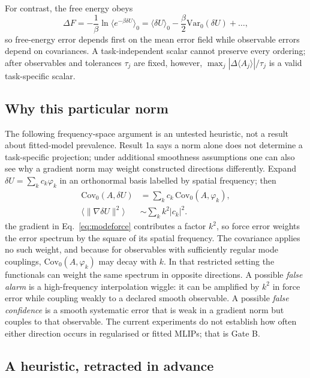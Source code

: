\documentclass[aip,jcp,reprint,amsmath,amssymb,floatfix]{revtex4-2}
\newcommand{\dU}{\ensuremath{\delta U}}
\newcommand{\avg}[1]{\ensuremath{\langle #1 \rangle}}
\newcommand{\avgz}[1]{\ensuremath{\langle #1 \rangle_{0}}}
\newcommand{\Cov}{\ensuremath{\mathrm{Cov}}}
\newcommand{\Var}{\ensuremath{\mathrm{Var}}}
\begin{document}
For contrast, the free energy obeys\cite{Zwanzig1954}
\begin{equation}
\Delta F = -\frac{1}{\beta}\ln\avgz{e^{-\beta\dU}}
= \avgz{\dU} - \frac{\beta}{2}\Var_0(\dU) + \dots,
\end{equation}
so free-energy error depends first on the mean error field while observable
errors depend on covariances. A task-independent scalar cannot preserve every
ordering; after observables and tolerances $\tau_j$ are fixed, however,
$\max_j|\Delta\avg{A_j}|/\tau_j$ is a valid task-specific scalar.

\subsection{Why this particular norm}
\label{sec:frequency}

The following frequency-space argument is an untested heuristic, not a result
about fitted-model prevalence. Result 1a says a norm alone does not determine a
task-specific projection; under additional smoothness assumptions one can also
see why a gradient norm may weight constructed directions differently.
Expand $\dU = \sum_k c_k \varphi_k$ in an orthonormal basis labelled by
spatial frequency; then
\begin{align}
\Cov_0(A,\dU) &= \sum_k c_k \,\Cov_0(A, \varphi_k), \label{eq:modecov}\\
\big\langle\|\nabla\dU\|^2\big\rangle &\sim \sum_k k^2 |c_k|^2. \label{eq:modeforce}
\end{align}
the gradient in Eq.~\eqref{eq:modeforce} contributes a factor $k^2$, so force
error weights the error spectrum by the square of its spatial frequency. The
covariance applies no such weight, and because
for observables with sufficiently regular mode couplings, $\Cov_0(A,
\varphi_k)$ may decay with $k$. In that restricted setting the functionals can
weight the same spectrum in opposite directions. A possible \emph{false alarm}
is a high-frequency interpolation wiggle: it can be amplified by $k^2$ in force
error while coupling weakly to a declared smooth observable. A possible
\emph{false confidence} is a smooth systematic error that is weak in a gradient
norm but couples to that observable. The current experiments do not establish
how often either direction occurs in regularised or fitted MLIPs; that is Gate B.

\subsection{A heuristic, retracted in advance}
\label{sec:retraction}
\end{document}
